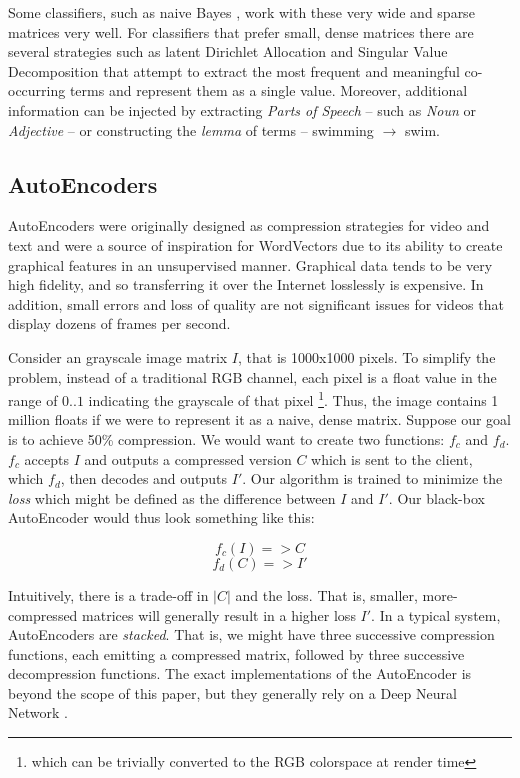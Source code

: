 \par{
Some classifiers, such as naive Bayes \cite{rish2001empirical}, work with these very wide and sparse matrices very well. For classifiers that prefer small, dense matrices there are several strategies such as latent Dirichlet Allocation \cite{blei2003latent} and Singular Value Decomposition \cite{} that attempt to extract the most frequent and meaningful co-occurring terms and represent them as a single value. Moreover, additional information can be injected by extracting \textit{Parts of Speech} -- such as \textit{Noun} or \textit{Adjective} -- or constructing the \textit{lemma} of terms -- swimming $\rightarrow$ swim. 
}

\subsection{AutoEncoders}

\par{
AutoEncoders were originally designed as compression strategies for video and text and were a source of inspiration for WordVectors due to its ability to create graphical features in an unsupervised manner. Graphical data tends to be very high fidelity, and so transferring it over the Internet losslessly is expensive. In addition, small errors and loss of quality are not significant issues for videos that display dozens of frames per second.
}
\par{
Consider an grayscale image matrix $I$, that is \textsf{1000x1000} pixels. To simplify the problem, instead of a traditional RGB channel, each pixel is a float value in the range of $0..1$ indicating the grayscale of that pixel \footnote{which can be trivially converted to the RGB colorspace at render time}. Thus, the image contains 1 million floats if we were to represent it as a naive, dense matrix. Suppose our goal is to achieve 50\% compression. We would want to create two functions: $f_c$ and $f_d$. $f_c$ accepts $I$ and outputs a compressed version $C$ which is sent to the client, which $f_d$, then decodes and outputs $I'$. Our algorithm is trained to minimize the \textit{loss} which might be defined as the difference between $I$ and $I'$. Our black-box AutoEncoder would thus look something like this:
}

\[f_c(I) => C \]
\[ f_d(C) => I' \]

\par{
Intuitively, there is a trade-off in $|C|$ and the loss. That is, smaller, more-compressed matrices will generally result in a higher loss $I'$. In a typical system, AutoEncoders are \textit{stacked}. That is, we might have three successive compression functions, each emitting a compressed matrix, followed by three successive decompression functions. The exact implementations of the AutoEncoder is beyond the scope of this paper, but they generally rely on a Deep Neural Network \cite{}.
}

